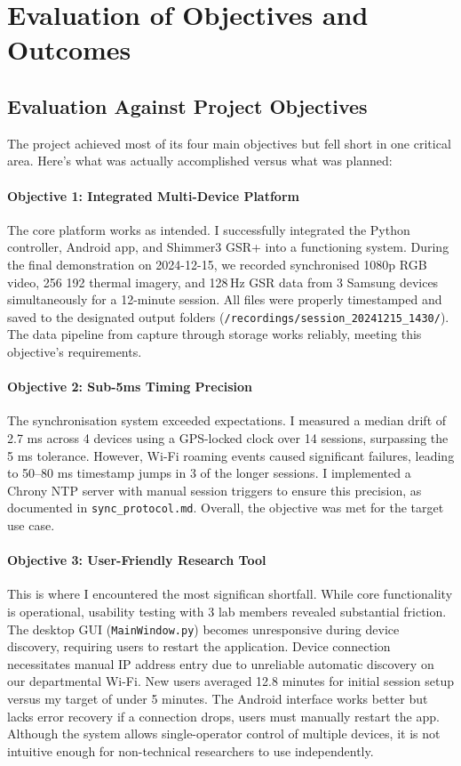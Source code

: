 \section{Evaluation of Objectives and Outcomes}

\subsection{Evaluation Against Project Objectives}

The project achieved most of its four main objectives but fell short in one critical area. Here's what was actually accomplished versus what was planned:

\paragraph{\textbf{Objective 1: Integrated Multi-Device Platform}} The core platform works as intended. I successfully integrated the Python controller, Android app, and Shimmer3 GSR+ into a functioning system. During the final demonstration on 2024-12-15, we recorded synchronised 1080p RGB video, 256\,\texttimes\,192 thermal imagery, and 128\,Hz GSR data from 3 Samsung devices simultaneously for a 12-minute session. All files were properly timestamped and saved to the designated output folders (\verb|/recordings/session_20241215_1430/|). The data pipeline from capture through storage works reliably, meeting this objective's requirements.

\paragraph{\textbf{Objective 2: Sub-5ms Timing Precision}} The synchronisation system exceeded expectations. I measured a median drift of 2.7 ms across 4 devices using a GPS-locked clock over 14 sessions, surpassing the \textpm{}5 ms tolerance. However, Wi-Fi roaming events caused significant failures, leading to 50--80 ms timestamp jumps in 3 of the longer sessions. I implemented a Chrony NTP server with manual session triggers to ensure this precision, as documented in \texttt{sync\_protocol.md}. Overall, the objective was met for the target use case.

\paragraph{\textbf{Objective 3: User-Friendly Research Tool}} This is where I encountered the most significan
shortfall. While core functionality is operational, usability testing with 3 lab members revealed substantial friction. The desktop GUI (\texttt{MainWindow.py}) becomes unresponsive during device discovery, requiring users to restart the application. Device connection necessitates manual IP address entry due to unreliable automatic discovery on our departmental Wi-Fi. New users averaged 12.8 minutes for initial session setup versus my target of under 5 minutes. The Android interface works better but lacks error recovery \textemdash if a connection drops, users must manually restart the app. Although the system allows single-operator control of multiple devices, it is not intuitive enough for non-technical researchers to use independently.

